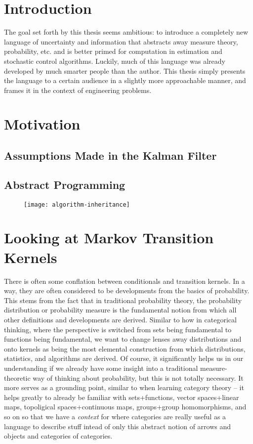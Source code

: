 \chapter{Introduction}

The goal set forth by this thesis seems ambitious: to introduce a completely new language of uncertainty and information that abstracts away measure theory, probability, etc. and is better primed for computation in estimation and stochastic control algorithms.
Luckily, much of this language was already developed by much smarter people than the author. This thesis simply presents the language to a certain audience in a slightly more approachable manner, and frames it in the context of engineering problems.
\chapter{Motivation}
\section{Assumptions Made in the Kalman Filter}
\section{Abstract Programming}

\begin{figure}
    \label{fig:algorithm-inheritance}
    \texttt{[image: algorithm-inheritance]}
\end{figure}

\chapter{Looking at Markov Transition Kernels}

There is often some conflation between conditionals and transition kernels.
In a way, they are often considered to be developments from the basics of probability.
This stems from the fact that in traditional probability theory, the probability distribution or probability measure is the fundamental notion from which all other definitions and developments are derived.
Similar to how in categorical thinking, where the perspective is switched from sets being fundamental to functions being fundamental, we want to change lenses away distributions and onto kernels as being the most elemental construction from which distributions, statistics, and algorithms are derived. 
Of course, it significantly helps us in our understanding if we already have some insight into a traditional measure-theoretic way of thinking about probability, but this is not totally necessary.
It more serves as a grounding point, similar to when learning category theory -- it helps greatly to already be familiar with sets+functions, vector spaces+linear maps, topoligical spaces+continuous maps, groups+group homomorphisms, and so on so that we have a \emph{context} for where categories are really useful as a language to describe stuff intead of only this abstract notion of arrows and objects and categories of categories.

